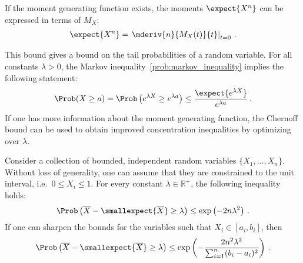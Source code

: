    \begin{property}
        If the moment generating function exists, the moments $\expect{X^n}$ can be expressed in terms of $M_X$:
        \begin{gather}
            \label{prob:moment_generating}
            \expect{X^n} = \left.\mderiv{n}{M_X(t)}{t}\right|_{t=0}\,.
        \end{gather}
    \end{property}

    \begin{method}
        This bound gives a bound on the tail probabilities of a random variable. For all constants $\lambda>0$, the Markov inequality~\ref{prob:markov_inequality} implies the following statement:
        \begin{gather}
            \Prob(X\geq a)=\Prob\left(e^{\lambda X}\geq e^{\lambda a}\right)\leq\frac{\expect{e^{\lambda X}}}{e^{\lambda a}}\,.
        \end{gather}
        If one has more information about the moment generating function, the Chernoff bound can be used to obtain improved concentration inequalities by optimizing over $\lambda$.
    \end{method}
    \begin{property}\label{prob:hoeffding_inequality}
        Consider a collection of bounded, independent random variables $\{X_1,\ldots,X_n\}$. Without loss of generality, one can assume that they are constrained to the unit interval, i.e.~$0\leq X_i\leq 1$. For every constant $\lambda\in\mathbb{R}^+$, the following inequality holds:
        \begin{gather}
            \Prob\left(\overline{X}-\smallexpect{\overline{X}}\geq\lambda\right)\leq\exp\left(-2n\lambda^2\right)\,.
        \end{gather}
        If one can sharpen the bounds for the variables such that $X_i\in[a_i,b_i]$, then
        \begin{gather}
            \Prob\left(\overline{X}-\smallexpect{\overline{X}}\geq\lambda\right)\leq\exp\left(-\frac{2n^2\lambda^2}{\sum_{i=1}^n(b_i-a_i)^2}\right)\,.
        \end{gather}
    \end{property}

